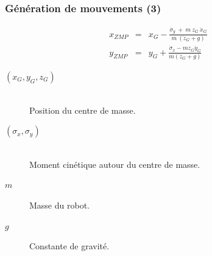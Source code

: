 \documentclass[14pt,utf8,hyperref={pdfpagelabels=false}]{beamer}
\begin{document}
\begin{slideDecision}
  \frametitle{Génération de mouvements (3)}


  \begin{changeleftmargin}{1.1cm}
  \begin{center}
    \begin{equation*}
    \begin{array}{lll}
    x_{ZMP} &=& x_G -
    \frac{\dot{\sigma}_y\ +\ m\ z_G\ \ddot{x}_G}{m\ (\ddot{z}_G + g)}\\
    y_{ZMP} &=& y_G +
    \frac{\dot{\sigma}_x - m z_G \ddot{y}_G}{m (\ddot{z}_G + g)}
    \end{array}
  \end{equation*}

  \end{center}

  \begin{description}
    \item[$(x_G, y_G, z_G)$]~\\
      Position du centre de masse.
    \item[$(\sigma_x, \sigma_y)$]~\\
      Moment cinétique autour du centre de masse.
    \item[$m$] Masse du robot.
    \item[$g$] Constante de gravité.
  \end{description}

  \end{changeleftmargin}
\end{slideDecision}
\end{document}
